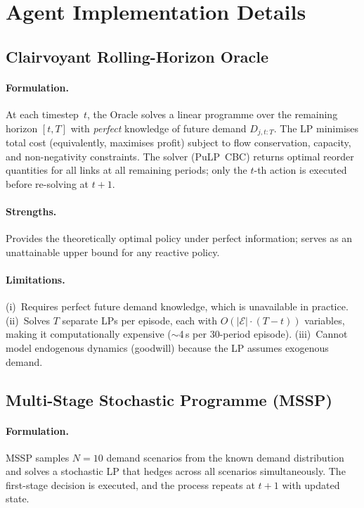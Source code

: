 \section{Agent Implementation Details}\label{app:agents}

\subsection{Clairvoyant Rolling-Horizon Oracle}

\paragraph{Formulation.}
At each timestep~$t$, the Oracle solves a linear programme over the
remaining horizon $[t, T]$ with \emph{perfect} knowledge of future demand
$D_{j,t:T}$. The LP minimises total cost (equivalently, maximises profit)
subject to flow conservation, capacity, and non-negativity constraints.
The solver (PuLP~CBC) returns optimal reorder quantities for all links
at all remaining periods; only the $t$-th action is executed before
re-solving at $t{+}1$.

\paragraph{Strengths.} Provides the theoretically optimal policy under
perfect information; serves as an unattainable upper bound for any
reactive policy.

\paragraph{Limitations.} (i)~Requires perfect future demand knowledge,
which is unavailable in practice. (ii)~Solves $T$ separate LPs per
episode, each with $O(|\mathcal{E}| \cdot (T-t))$ variables, making it
computationally expensive ($\sim$4\,s per 30-period episode). (iii)~Cannot
model endogenous dynamics (goodwill) because the LP assumes exogenous demand.

\subsection{Multi-Stage Stochastic Programme (MSSP)}

\paragraph{Formulation.}
MSSP samples $N{=}10$ demand scenarios from the known demand distribution
and solves a stochastic LP that hedges across all scenarios simultaneously.
The first-stage decision is executed, and the process repeats at $t{+}1$
with updated state.

